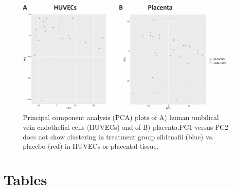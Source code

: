\documentclass[authordate, empirical,issue]{jote-new-article}
\begin{document}
\begin{figure}[h!]
  \includegraphics[width=\linewidth]{media/image1.jpeg}

  \caption{Principal component analysis (PCA) plots of A) human umbilical vein endothelial cells (HUVECs) and of B) placenta.PC1 versus PC2 does not show clustering in treatment group sildenafil (blue) vs. placebo (red) in HUVECs or placental tissue.}

  \label{fig:rId8}


\end{figure}





\newpage

\section{Tables}
\end{document}

